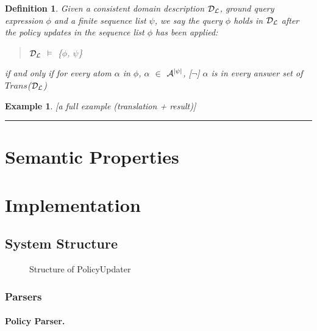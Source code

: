 \documentclass[10pt, twocolumn]{article}
\newtheorem{definition}{Definition}
\newtheorem{examp}{Example}
\newenvironment{example}{\begin{examp}\rm}{\rule{2mm}{2mm}\end{examp}}
\begin{document}
        \begin{definition}
          Given a consistent domain description ${\cal D}_{\cal L}$, ground
          query expression $\phi$ and a finite sequence list $\psi$, we say the
          query $\phi$ holds in ${\cal D}_{\cal L}$ after the policy updates
          in the sequence list $\phi$ has been applied:

          \begin{quote}
            ${\cal D}_{\cal L}$ $\models$ \{$\phi$, $\psi$\}
          \end{quote}

          \noindent if and only if for every atom $\alpha$ in $\phi$, $\alpha$
          $\in$ ${\cal A}^{|\psi|}$, [$\lnot$] $\alpha$ is in every answer
          set of $Trans$(${\cal D}_{\cal L}$)
        \end{definition}

    \begin{example}
      [a full example (translation + result)]

    \end{example}

  \section{Semantic Properties}

  \section{Implementation}

    \subsection{System Structure}

    \begin{figure}[ht]
      \begin{center}
        \caption{Structure of PolicyUpdater}
        \label{fig-1}
      \end{center}
    \end{figure}

      \subsubsection{Parsers}

        \paragraph{Policy Parser.}
\end{document}
